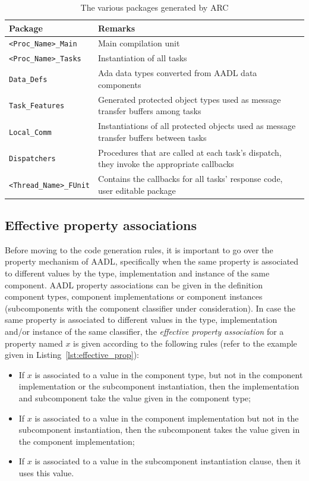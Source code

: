 \begin{table}
\begin{tabular}{|l|l|}
\hline
\textbf{Package} & \textbf{Remarks}\\
\hline
\texttt{<Proc\_Name>\_Main} & Main compilation unit\\
\texttt{<Proc\_Name>\_Tasks} & Instantiation of all tasks\\
\texttt{Data\_Defs} & Ada data types converted from AADL
data components\\
\texttt{Task\_Features} & Generated protected object
types used as message transfer buffers among tasks\\
\texttt{Local\_Comm} & Instantiations of all protected
objects used as message transfer buffers between tasks\\
\texttt{Dispatchers} & Procedures that are called at each
task's dispatch, they invoke the appropriate callbacks\\
\texttt{<Thread\_Name>\_FUnit} & Contains the callbacks for all tasks'
response code, user editable package\\
\hline
\end{tabular}
\caption{The various packages generated by ARC}
\label{tab:packages}
\end{table}

\subsection{Effective property associations}
Before moving to the code generation rules, it is important to go over
the property mechanism of AADL, specifically when the same property is
associated to different values by the type, implementation and
instance of the same component. AADL property associations can be
given in the definition component types, component implementations or
component instances (subcomponents with the component classifier under
consideration). In case the same property is associated to different
values in the type, implementation and/or instance of the same
classifier, the \emph{effective property association} for a property
named $x$ is given according to the following rules (refer to the
example given in Listing~\ref{lst:effective_prop}):

\begin{itemize}
\item{If $x$ is associated to a value in the component type, but not
  in the component implementation or the subcomponent instantiation,
  then the implementation and subcomponent take the value given in the
  component type;}
\item{If $x$ is associated to a value in the component implementation
  but not in the subcomponent instantiation, then the subcomponent
  takes the value given in the component implementation;}
\item{If $x$ is associated to a value in the subcomponent
  instantiation clause, then it uses this value.}
\end{itemize}


